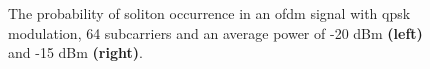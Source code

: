 \begin{figure}[htpb]
    \begin{minipage}[h]{0.49\linewidth}
    \end{minipage}
    \hfill
    \begin{minipage}[h]{0.49\linewidth}
    \end{minipage}
    \caption{The probability of soliton occurrence in an \acrshort{ofdm} signal with \acrshort{qpsk} modulation, 64 subcarriers and an average power of -20 dBm \textbf{(left)} and -15 dBm \textbf{(right)}.}
    \label{fig:ds_stat}
\end{figure}

